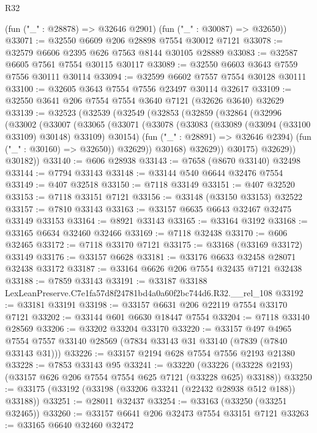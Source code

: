 \begin{lexlean}{R32}
\begin{coremodule}
      (fun ("_" : @28878) => @32646 @2901)
      (fun ("_" : @30087) => @32650))
@33071 := @32550 @6609 @206 @28898 @7554 @30012 @7121
@33078 := @32579 @6606 @2395 @626 @7563 @8144 @30105 @28889
@33083 := @32587 @6605 @7561 @7554 @30115 @30117
@33089 := @32550 @6603 @3643 @7559 @7556 @30111 @30114
@33094 := @32599 @6602 @7557 @7554 @30128 @30111
@33100 := @32605 @3643 @7554 @7556 @23497 @30114 @32617
@33109 := @32550 @3641 @206 @7554 @7554 @3640 @7121 (@32626 @3640) @32629
@33139 := @32523
    (@32539
      (@32549
        (@32853
          (@32859
            (@32864
              (@32996
                (@33002
                  (@33007
                    (@33065
                      (@33071
                        (@33078
                          (@33083 (@33089 (@33094 (@33100 @33109) @30148) @33109) @30154)
                          (fun ("_" : @28891) => @32646 @2394)
                          (fun ("_" : @30160) => @32650))
                        @32629))
                    @30168)
                  @32629))
              @30175)
            @32629))
        @30182))
@33140 := @606 @28938
@33143 := @7658 (@8670 @33140) @32498
@33144 := @7794 @33143
@33148 := @33144 @540 @6644 @32476 @7554
@33149 := @407 @32518
@33150 := @7118 @33149
@33151 := @407 @32520
@33153 := @7118 @33151 @7121
@33156 := @33148 (@33150 @33153) @32522
@33157 := @7810 @33143
@33163 := @33157 @6635 @6643 @32467 @32475 @33149 @33153
@33164 := @8921 @33143
@33165 := @33164 @3192
@33168 := @33165 @6634 @32460 @32466
@33169 := @7118 @32438
@33170 := @606 @32465
@33172 := @7118 @33170 @7121
@33175 := @33168 (@33169 @33172) @33149
@33176 := @33157 @6628
@33181 := @33176 @6633 @32458 @28071 @32438 @33172
@33187 := @33164 @6626 @206 @7554 @32435 @7121 @32438
@33188 := @7859 @33143
@33191 := @33187 @33188 LexLeanPreserve.C7e1fa57d8f24781bd4a0a60f2bc744d6.R32.__rel_108
@33192 := @33181 @33191
@33198 := @33157 @6631 @206 @22119 @7554 @33170 @7121
@33202 := @33144 @601 @6630 @18447 @7554
@33204 := @7118 @33140 @28569
@33206 := @33202 @33204 @33170
@33220 := @33157
    @497
    @4965
    @7554
    @7557
    @33140
    @28569
    (@7834 @33143 @31 @33140 (@7839 (@7840 @33143 @31)))
@33226 := @33157 @2194 @628 @7554 @7556 @2193 @21380
@33228 := @7853 @33143 @95
@33241 := @33220
    (@33226 (@33228 @2193) (@33157 @626 @206 @7554 @7554 @625 @7121 (@33228 @625) @33188))
@33250 := @33175 (@33192 (@33198 (@33206 @33241 (@22432 @28938 @512 @188)) @33188))
@33251 := @28011 @32437
@33254 := @33163 (@33250 (@33251 @32465))
@33260 := @33157 @6641 @206 @32473 @7554 @33151 @7121
@33263 := @33165 @6640 @32460 @32472

\end{coremodule}
\end{lexlean}
